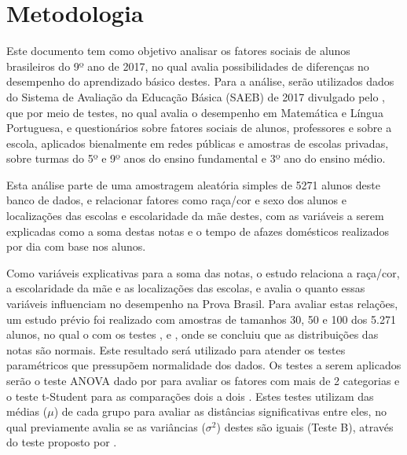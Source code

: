 


\chapter{Metodologia}
Este documento tem como objetivo analisar os fatores sociais de alunos brasileiros do 9º ano de 2017,
no qual avalia possibilidades de diferenças no desempenho do aprendizado básico destes.
Para a análise, serão utilizados dados do Sistema de Avaliação da Educação Básica (SAEB) de 2017 
divulgado pelo , que por meio de testes, no qual avalia o desempenho em Matemática e Língua Portuguesa,
e questionários sobre fatores sociais de alunos, professores e  sobre a escola, aplicados bienalmente em redes públicas
e amostras de escolas privadas, sobre turmas do 5º e 9º anos do ensino fundamental e 
3º ano do ensino médio.

Esta análise parte de uma amostragem aleatória simples de 5271 alunos deste banco de dados, e relacionar 
fatores como raça/cor e sexo dos alunos e localizações das escolas e escolaridade da mãe destes, com as variáveis
a serem explicadas como a soma destas notas e o tempo de afazes domésticos realizados por dia com base nos alunos.

Como variáveis explicativas para a soma das notas, o estudo relaciona a raça/cor, a escolaridade da mãe e as localizações das escolas,
e avalia o quanto essas variáveis influenciam no desempenho na Prova Brasil. Para avaliar estas relações, um estudo prévio foi realizado
com amostras de tamanhos 30, 50 e 100 dos 5.271 alunos, no qual o com os testes , 
e , onde se concluiu que as distribuições das notas são normais. Este resultado será utilizado para atender
os testes paramétricos que pressupõem normalidade dos dados. Os testes a serem aplicados serão o teste ANOVA dado por  para 
avaliar os fatores com mais de 2 categorias e o teste t-Student para as comparações dois a dois \cite{o1908student}.
Estes testes utilizam das médias ($\mu$) de cada grupo para avaliar as distâncias significativas entre eles, no qual previamente avalia se as
variâncias ($\sigma^2$) destes são iguais (Teste B), através do teste proposto por .


